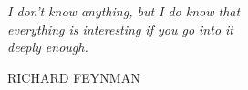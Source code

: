 \documentclass{these-dbl}
\newlength\longest
\begin{document}




\clearemptydoublepage
{
  \sffamily
  
}

\clearemptydoublepage


{
\thispagestyle{empty}
\null\vfill

\settowidth{}
\centering
\parbox{\longest}{%
  \rmfamily
  \raggedright{\Large\itshape%
  I don't know anything, but I do know that\\
  everything is interesting if you go into it\\
  deeply enough.\par\bigskip
  }
  \raggedleft\large\MakeUppercase{Richard Feynman}\par%
}

\vfill\vfill

\clearpage
\pagestyle{plain}
}

\clearemptydoublepage

\frontmatter
\tableofcontents %
\listoffigures
\listoftables

\clearemptydoublepage

\mainmatter



\clearpage

\clearemptydoublepage
\end{document}
